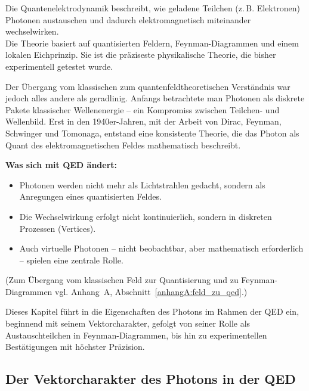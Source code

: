 \vspace{1em}
\begin{tcolorbox}[physikbox, title=Was ist Quantenelektrodynamik?]
	\label{box:was ist quantenelektro}
	\small
	Die Quantenelektrodynamik beschreibt, wie geladene Teilchen (z.\,B. Elektronen) Photonen austauschen und dadurch elektromagnetisch miteinander wechselwirken.\\
	Die Theorie basiert auf quantisierten Feldern, Feynman-Diagrammen und einem lokalen Eichprinzip. Sie ist die präziseste physikalische Theorie, die bisher experimentell getestet wurde.
\end{tcolorbox}
\vspace{1em}
Der Übergang vom klassischen zum quantenfeldtheoretischen Verständnis war jedoch alles andere als geradlinig. Anfangs betrachtete man Photonen als diskrete Pakete klassischer Wellenenergie – ein Kompromiss zwischen Teilchen- und Wellenbild.
Erst in den 1940er-Jahren, mit der Arbeit von Dirac, Feynman, Schwinger und Tomonaga, entstand eine konsistente Theorie, die das Photon als Quant des elektromagnetischen Feldes mathematisch beschreibt.

\textbf{Was sich mit QED ändert:}
\begin{itemize}
	\item Photonen werden nicht mehr als Lichtstrahlen gedacht, sondern als Anregungen eines quantisierten Feldes.
	\item Die Wechselwirkung erfolgt nicht kontinuierlich, sondern in diskreten Prozessen (Vertices).
	\item Auch virtuelle Photonen – nicht beobachtbar, aber mathematisch erforderlich – spielen eine zentrale Rolle.
\end{itemize}
(Zum Übergang vom klassischen Feld zur Quantisierung und zu Feynman-Diagrammen vgl. Anhang~A, Abschnitt~\ref{anhangA:feld_zu_qed}.)

Dieses Kapitel führt in die Eigenschaften des Photons im Rahmen der QED ein, beginnend mit seinem Vektorcharakter, gefolgt von seiner Rolle als Austauschteilchen in Feynman-Diagrammen, bis hin zu experimentellen Bestätigungen mit höchster Präzision.

\subsection{Der Vektorcharakter des Photons in der QED}

